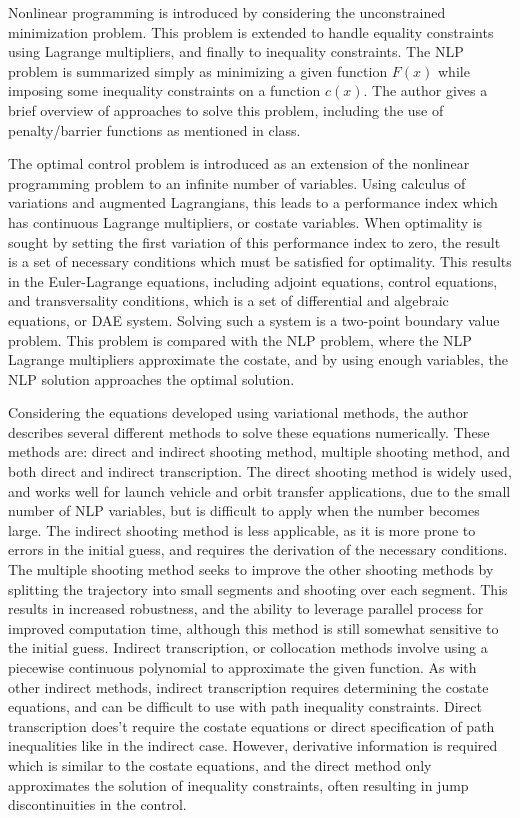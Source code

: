 \documentclass[11pt,letterpaper,onecolumn,notitlepage]{article}
\begin{document}
  Nonlinear programming is introduced by considering the unconstrained minimization problem.
  This problem is extended to handle equality constraints using Lagrange multipliers, and finally to inequality constraints.
  The NLP problem is summarized simply as minimizing a given function $F(x)$ while imposing some inequality constraints on a function $c(x)$.
  The author gives a brief overview of approaches to solve this problem, including the use of penalty/barrier functions as mentioned in class.

  The optimal control problem is introduced as an extension of the nonlinear programming problem to an infinite number of variables.
  Using calculus of variations and augmented Lagrangians, this leads to a performance index which has continuous Lagrange multipliers, or costate variables.
  When optimality is sought by setting the first variation of this performance index to zero, the result is a set of necessary conditions which must be satisfied for optimality.
  This results in the Euler-Lagrange equations, including adjoint equations, control equations, and transversality conditions, which is a set of differential and algebraic equations, or DAE system.
  Solving such a system is a two-point boundary value problem.
  This problem is compared with the NLP problem, where the NLP Lagrange multipliers approximate the costate, and by using enough variables, the NLP solution approaches the optimal solution.

  Considering the equations developed using variational methods, the author describes several different methods to solve these equations numerically.
  These methods are: direct and indirect shooting method, multiple shooting method, and both direct and indirect transcription.
  The direct shooting method is widely used, and works well for launch vehicle and orbit transfer applications, due to the small number of NLP variables, but is difficult to apply when the number becomes large.
  The indirect shooting method is less applicable, as it is more prone to errors in the initial guess, and requires the derivation of the necessary conditions.
  The multiple shooting method seeks to improve the other shooting methods by splitting the trajectory into small segments and shooting over each segment.
  This results in increased robustness, and the ability to leverage parallel process for improved computation time, although this method is still somewhat sensitive to the initial guess.
  Indirect transcription, or collocation methods involve using a piecewise continuous polynomial to approximate the given function.
  As with other indirect methods, indirect transcription requires determining the costate equations, and can be difficult to use with path inequality constraints.
  Direct transcription does't require the costate equations or direct specification of path inequalities like in the indirect case.
  However, derivative information is required which is similar to the costate equations, and the direct method only approximates the solution of inequality constraints, often resulting in jump discontinuities in the control.
\end{document}
